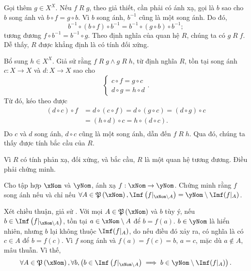 Gọi thêm $g \in X^X$. Nếu $f\;R\;g$, theo giả thiết, cần phải có ánh xạ, gọi là $b$ sao cho $b$ song ánh và $b \circ f = g \circ b$. Vì $b$ song ánh, $b^{-1}$ cũng là một song ánh. Do đó, 
\begin{equation*}
   b^{-1} \circ (b \circ f) \circ b^{-1} = b^{-1} \circ (g \circ b) \circ b^{-1};
\end{equation*}
tương đương $f \circ b^{-1} = b^{-1} \circ g$. Theo định nghĩa của quan hệ $R$, chúng ta có $g\;R\;f$. Dễ thấy, $R$ được khẳng định là có tính đối xứng.

Bổ sung $h \in X^X$. Giả sử rằng $f\;R\;g \land g\;R\;h$, từ định nghĩa $R$, tồn tại song ánh $c: X \to X$ và $d: X \to X$ sao cho \begin{equation*}
   \begin{cases}
      c \circ f = g \circ c \\
      d \circ g = h \circ d 
   \end{cases}.
\end{equation*}
Từ đó, kéo theo được \begin{align*}
   (d \circ c) \circ f &= d \circ (c \circ f) = d \circ (g \circ c) = (d \circ g) \circ c \\
   &= (h \circ d) \circ c = h \circ (d \circ c). \\
\end{align*} 
Do $c$ và $d$ song ánh, $d \circ c$ cũng là một song ánh, dẫn đến $f\;R\;h$. Qua đó, chúng ta thấy được tính bắc cầu của $R$.

Vì $R$ có tính phản xạ, đối xứng, và bắc cầu, $R$ là một quan hệ tương đương. Điều phải chứng minh.

\exercise Cho tập hợp $\xNom$ và $\yNom$, ánh xạ $f: \xNom \to \yNom$. Chứng minh rằng $f$ song ánh nếu và chỉ nếu $\forall A \in \mathfrak{P}\left(\xNom\right), \Imf\left(f|_{\xNom \setminus A}\right) = \yNom \setminus \Imf(f|_A)$.

\solution

Xét chiều thuận, giả sử . Với mọi $A \in \mathfrak{P}\left(\xNom\right)$ và $b$ tùy ý, nếu $b \in \Imf\left(f|_{\xNom \setminus A}\right)$, tồn tại $a \in \xNom \setminus A$ để $b = f(a)$. $b \in \yNom$ là hiển nhiên, nhưng $b$ lại không thuộc $\Imf(f|_A)$, do nếu điều đó xảy ra, có nghĩa là có $c \in A$ để $b = f(c)$. Vì $f$ song ánh và $f(a) = f(c) = b$, $a = c$, mặc dù $a \notin A$, mâu thuẫn. Vì thế, 
\begin{equation*}
   \forall A \in \mathfrak{P}\left(\xNom\right), \forall b, \left(b \in \Imf\left(f|_{\xNom \setminus A}\right) \implies b \in \yNom \setminus \Imf(f|_A)\right).
\end{equation*}

